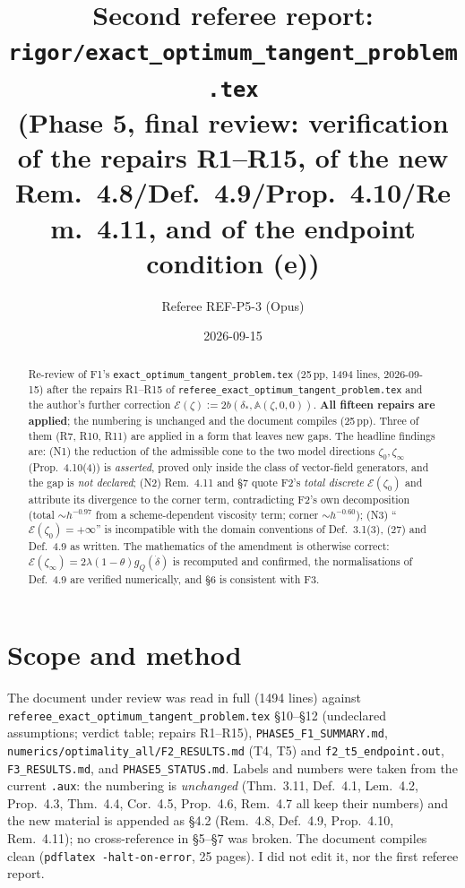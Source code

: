 \documentclass[11pt]{article}
\title{Second referee report: \texttt{rigor/exact\_optimum\_tangent\_problem.tex}\\
\large (Phase 5, final review: verification of the repairs R1--R15, of the new
Rem.~4.8/Def.~4.9/Prop.~4.10/Rem.~4.11, and of the endpoint condition (e))}
\author{Referee REF-P5-3 (Opus)}\date{2026-09-15}
\newcommand{\Aop}{\mathbb A}
\begin{document}
\maketitle
\begin{abstract}
Re-review of F1's \texttt{exact\_optimum\_tangent\_problem.tex} (25\,pp, 1494 lines,
2026-09-15) after the repairs R1--R15 of
\texttt{referee\_exact\_optimum\_tangent\_problem.tex} and the author's further correction
$\mathcal E(\zeta):=2b(\delta_*,\Aop(\zeta,0,0))$.  \textbf{All fifteen repairs are
applied}; the numbering is unchanged and the document compiles (25\,pp).  Three of them
(R7, R10, R11) are applied in a form that leaves new gaps.  The headline findings are:
(N1) the reduction of the admissible cone to the two model directions
$\zeta_0,\zeta_\infty$ (Prop.~4.10(4)) is \emph{asserted}, proved only inside the class of
vector-field generators, and the gap is \emph{not declared}; (N2) Rem.~4.11 and \S7 quote
F2's \emph{total discrete} $\mathcal E(\zeta_0)$ and attribute its divergence to the corner
term, contradicting F2's own decomposition (total $\sim h^{-0.97}$ from a scheme-dependent
viscosity term; corner $\sim h^{-0.60}$); (N3) ``$\mathcal E(\zeta_0)=+\infty$'' is
incompatible with the domain conventions of Def.~3.1(3), (27) and Def.~4.9 as
written.  The mathematics of the amendment is otherwise correct: $\mathcal E(\zeta_\infty)
=2\lambda(1-\theta)g_Q(\dot\delta)$ is recomputed and confirmed, the normalisations of
Def.~4.9 are verified numerically, and \S6 is consistent with F3.
\end{abstract}

\section{Scope and method}\label{sec:scope}
The document under review was read in full (1494 lines) against
\texttt{referee\_exact\_optimum\_tangent\_problem.tex} \S10--\S12 (undeclared assumptions;
verdict table; repairs R1--R15), \texttt{PHASE5\_F1\_SUMMARY.md},
\texttt{numerics/optimality\_all/F2\_RESULTS.md} (T4, T5) and \texttt{f2\_t5\_endpoint.out},
\texttt{F3\_RESULTS.md}, and \texttt{PHASE5\_STATUS.md}.  Labels and numbers were taken from
the current \texttt{.aux}: the numbering is \emph{unchanged} (Thm.~3.11, Def.~4.1,
Lem.~4.2, Prop.~4.3, Thm.~4.4, Cor.~4.5, Prop.~4.6, Rem.~4.7 all keep their numbers) and
the new material is appended as \S4.2 (Rem.~4.8, Def.~4.9, Prop.~4.10, Rem.~4.11); no
cross-reference in \S5--\S7 was broken.  The document compiles clean
(\texttt{pdflatex -halt-on-error}, 25 pages).  I did not edit it, nor the first referee
report.
\end{document}
